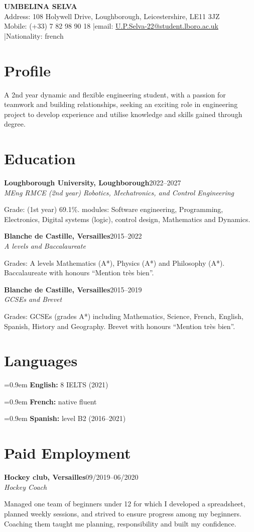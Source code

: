 \documentclass[10pt,a4paper]{article}
\newcommand{\cvitem}[2]{%
  \hangindent=0.9em\hangafter=1
  \textbf{#1} #2\par
}
\newcommand{\cventry}[4]{%
  \textbf{#1}\hfill \textcolor{textgray}{#2}\\[-0.5pt]
  \textit{#3}\hfill \textit{#4}\par
}
\begin{document}
\color{textgray}
\fontsize{8.55}{9.25}\selectfont

\begin{center}
  {\Large\bfseries\color{accent} UMBELINA SELVA}\\[2.5pt]
  Address: 108 Holywell Drive, Loughborough, Leicestershire, LE11 3JZ\\
  Mobile: (+33) 7 82 98 90 18 \quad|\quad email: \href{mailto:U.P.Selva-22@student.lboro.ac.uk}{U.P.Selva-22@student.lboro.ac.uk} \quad|\quad Nationality: french
\end{center}

\section{Profile}
A 2nd year dynamic and flexible engineering student, with a passion for teamwork and building relationships, seeking an exciting role in engineering project to develop experience and utilise knowledge and skills gained through degree.

\section{Education}
\cventry{Loughborough University, Loughborough}{2022--2027}{MEng RMCE (2nd year) Robotics, Mechatronics, and Control Engineering}{}
Grade: (1st year) 69.1\%. modules: Software engineering, Programming, Electronics, Digital systems (logic), control design, Mathematics and Dynamics.

\cventry{Blanche de Castille, Versailles}{2015--2022}{A levels and Baccalaureate}{}
Grades: A levels Mathematics (A*), Physics (A*) and Philosophy (A*). Baccalaureate with honours ``Mention très bien''.

\cventry{Blanche de Castille, Versailles}{2015--2019}{GCSEs and Brevet}{}
Grades: GCSEs (grades A*) including Mathematics, Science, French, English, Spanish, History and Geography. Brevet with honours ``Mention très bien''.

\section{Languages}
\cvitem{English:}{8 IELTS (2021)}
\cvitem{French:}{native fluent}
\cvitem{Spanish:}{level B2 (2016--2021)}

\section{Paid Employment}
\cventry{Hockey club, Versailles}{09/2019--06/2020}{Hockey Coach}{}
Managed one team of beginners under 12 for which I developed a spreadsheet, planned weekly sessions, and strived to ensure progress among my beginners. Coaching them taught me planning, responsibility and built my confidence.
\end{document}
